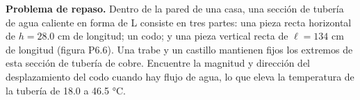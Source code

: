 \item \textbf{Problema de repaso.} Dentro de la pared de una casa, una sección de tubería de agua caliente en forma de L consiste en tres partes: una pieza recta horizontal de $h = 28.0\text{ cm}$ de longitud; un codo; y una pieza vertical recta de $\ell = 134\text{ cm}$ de longitud (figura P6.6). Una trabe y un castillo mantienen fijos los extremos de esta sección de tubería de cobre. Encuentre la magnitud y dirección del desplazamiento del codo cuando hay flujo de agua, lo que eleva la temperatura de la tubería de 18.0 a 46.5 °C.
